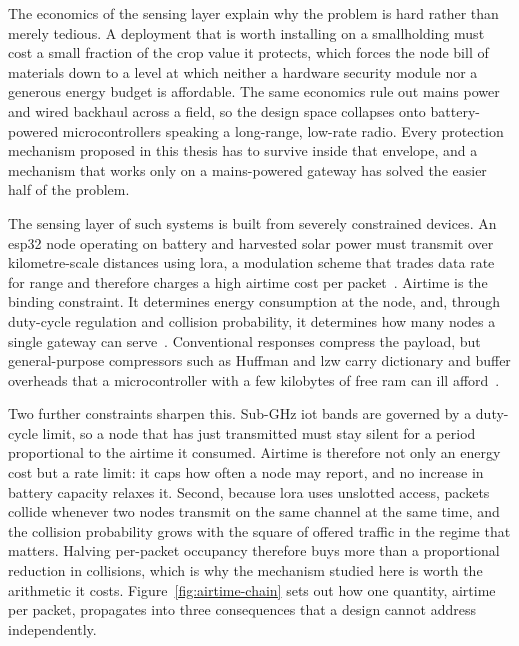 The economics of the sensing layer explain why the problem is hard rather than
merely tedious. A deployment that is worth installing on a smallholding must
cost a small fraction of the crop value it protects, which forces the node bill
of materials down to a level at which neither a hardware security module nor a
generous energy budget is affordable. The same economics rule out mains power
and wired backhaul across a field, so the design space collapses onto
battery-powered microcontrollers speaking a long-range, low-rate radio. Every
protection mechanism proposed in this thesis has to survive inside that
envelope, and a mechanism that works only on a mains-powered gateway has solved
the easier half of the problem.

The sensing layer of such systems is built from severely constrained devices.
An \gls{esp32} node operating on battery and harvested solar power must
transmit over kilometre-scale distances using \gls{lora}, a modulation scheme
that trades data rate for range and therefore charges a high airtime cost per
packet~\cite{raza2018lorawan, adelantado2017understanding}. Airtime is the
binding constraint. It determines energy consumption at the node, and, through
duty-cycle regulation and collision probability, it determines how many nodes a
single gateway can serve~\cite{mohammed2025loraEnergy}. Conventional responses
compress the payload, but general-purpose compressors such as Huffman and
\gls{lzw} carry dictionary and buffer overheads that a microcontroller with a
few kilobytes of free \gls{ram} can ill
afford~\cite{marcelloni2009energy, chen2025compression}.

Two further constraints sharpen this. Sub-GHz \gls{iot} bands are governed by a
duty-cycle limit, so a node that has just transmitted must stay silent for a
period proportional to the airtime it consumed. Airtime is therefore not only
an energy cost but a rate limit: it caps how often a node may report, and no
increase in battery capacity relaxes it. Second, because \gls{lora} uses
unslotted access, packets collide whenever two nodes transmit on the same
channel at the same time, and the collision probability grows with the square
of offered traffic in the regime that matters. Halving per-packet occupancy
therefore buys more than a proportional reduction in collisions, which is why
the mechanism studied here is worth the arithmetic it costs. Figure~\ref{fig:airtime-chain}
sets out how one quantity, airtime per packet, propagates into three
consequences that a design cannot address independently.

